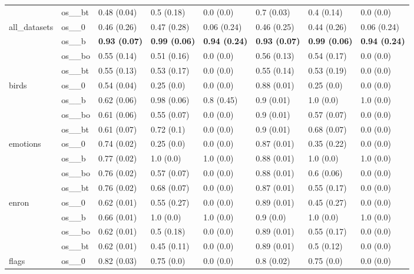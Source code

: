 \begin{tabular}{llllllll}
 & os__bt & 0.48 (0.04) & 0.5 (0.18) & 0.0 (0.0) & 0.7 (0.03) & 0.4 (0.14) & 0.0 (0.0) \\
\cline{1-8}
\multirow[t]{4}{*}{all_datasets} & os__0 & 0.46 (0.26) & 0.47 (0.28) & 0.06 (0.24) & 0.46 (0.25) & 0.44 (0.26) & 0.06 (0.24) \\
 & os__b & \textbf{0.93 (0.07)} & \textbf{0.99 (0.06)} & \textbf{0.94 (0.24)} & \textbf{0.93 (0.07)} & \textbf{0.99 (0.06)} & \textbf{0.94 (0.24)} \\
 & os__bo & 0.55 (0.14) & 0.51 (0.16) & 0.0 (0.0) & 0.56 (0.13) & 0.54 (0.17) & 0.0 (0.0) \\
 & os__bt & 0.55 (0.13) & 0.53 (0.17) & 0.0 (0.0) & 0.55 (0.14) & 0.53 (0.19) & 0.0 (0.0) \\
\cline{1-8}
\multirow[t]{4}{*}{birds} & os__0 & 0.54 (0.04) & 0.25 (0.0) & 0.0 (0.0) & 0.88 (0.01) & 0.25 (0.0) & 0.0 (0.0) \\
 & os__b & 0.62 (0.06) & 0.98 (0.06) & 0.8 (0.45) & 0.9 (0.01) & 1.0 (0.0) & 1.0 (0.0) \\
 & os__bo & 0.61 (0.06) & 0.55 (0.07) & 0.0 (0.0) & 0.9 (0.01) & 0.57 (0.07) & 0.0 (0.0) \\
 & os__bt & 0.61 (0.07) & 0.72 (0.1) & 0.0 (0.0) & 0.9 (0.01) & 0.68 (0.07) & 0.0 (0.0) \\
\cline{1-8}
\multirow[t]{4}{*}{emotions} & os__0 & 0.74 (0.02) & 0.25 (0.0) & 0.0 (0.0) & 0.87 (0.01) & 0.35 (0.22) & 0.0 (0.0) \\
 & os__b & 0.77 (0.02) & 1.0 (0.0) & 1.0 (0.0) & 0.88 (0.01) & 1.0 (0.0) & 1.0 (0.0) \\
 & os__bo & 0.76 (0.02) & 0.57 (0.07) & 0.0 (0.0) & 0.88 (0.01) & 0.6 (0.06) & 0.0 (0.0) \\
 & os__bt & 0.76 (0.02) & 0.68 (0.07) & 0.0 (0.0) & 0.87 (0.01) & 0.55 (0.17) & 0.0 (0.0) \\
\cline{1-8}
\multirow[t]{4}{*}{enron} & os__0 & 0.62 (0.01) & 0.55 (0.27) & 0.0 (0.0) & 0.89 (0.01) & 0.45 (0.27) & 0.0 (0.0) \\
 & os__b & 0.66 (0.01) & 1.0 (0.0) & 1.0 (0.0) & 0.9 (0.0) & 1.0 (0.0) & 1.0 (0.0) \\
 & os__bo & 0.62 (0.01) & 0.5 (0.18) & 0.0 (0.0) & 0.89 (0.01) & 0.55 (0.17) & 0.0 (0.0) \\
 & os__bt & 0.62 (0.01) & 0.45 (0.11) & 0.0 (0.0) & 0.89 (0.01) & 0.5 (0.12) & 0.0 (0.0) \\
\cline{1-8}
\multirow[t]{4}{*}{flags} & os__0 & 0.82 (0.03) & 0.75 (0.0) & 0.0 (0.0) & 0.8 (0.02) & 0.75 (0.0) & 0.0 (0.0) \\

\end{tabular}
